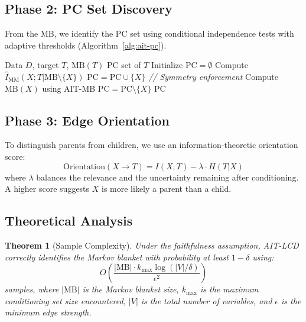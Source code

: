 \documentclass{article}
\theoremstyle{plain}
\newtheorem{theorem}{Theorem}
\theoremstyle{definition}
\begin{document}
\subsection{Phase 2: PC Set Discovery}

From the MB, we identify the PC set using conditional independence tests with adaptive thresholds (Algorithm~\ref{alg:ait-pc}).

\begin{algorithm}[t]
\caption{AIT-PC: PC Set Discovery}
\label{alg:ait-pc}
\begin{algorithmic}[1]
\Require Data $D$, target $T$, $\text{MB}(T)$
\Ensure PC set of $T$
\State Initialize $\text{PC} = \emptyset$
    \State Compute $\hat{I}_{\text{MM}}(X; T | \text{MB} \setminus \{X\})$
        \State $\text{PC} = \text{PC} \cup \{X\}$
    \EndIf
\EndFor
\State \textit{// Symmetry enforcement}
    \State Compute $\text{MB}(X)$ using AIT-MB
        \State $\text{PC} = \text{PC} \setminus \{X\}$
    \EndIf
\EndFor
\State \Return PC
\end{algorithmic}
\end{algorithm}

\subsection{Phase 3: Edge Orientation}

To distinguish parents from children, we use an information-theoretic orientation score:
\begin{equation}
\text{Orientation}(X \rightarrow T) = I(X; T) - \lambda \cdot H(T | X)
\end{equation}
where $\lambda$ balances the relevance and the uncertainty remaining after conditioning. A higher score suggests $X$ is more likely a parent than a child.

\subsection{Theoretical Analysis}

\begin{theorem}[Sample Complexity]\label{thm:sample_complexity}
Under the faithfulness assumption, AIT-LCD correctly identifies the Markov blanket with probability at least $1-\delta$ using:
\begin{equation}
O\left(\frac{|\text{MB}| \cdot k_{\max} \log(|V|/\delta)}{\epsilon^2}\right)
\end{equation}
samples, where $|\text{MB}|$ is the Markov blanket size, $k_{\max}$ is the maximum conditioning set size encountered, $|V|$ is the total number of variables, and $\epsilon$ is the minimum edge strength.
\end{theorem}
\end{document}
